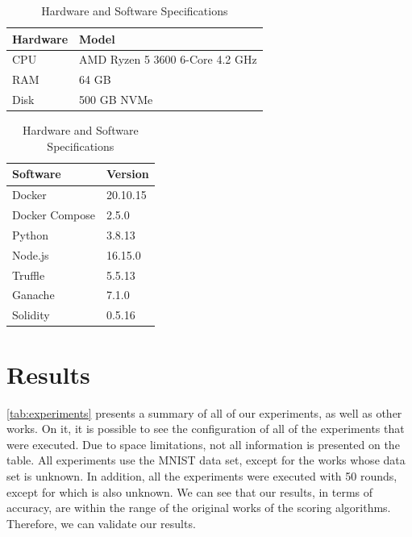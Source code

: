 \begin{table}[!h]
    \begin{subtable}[h]{0.59\textwidth}
        \centering
        \begin{tabular}{l|l} \hline \hline
            Hardware & Model                                    \\ \hline \hline
            CPU      & AMD Ryzen 5 3600 6-Core 4.2 GHz          \\ \hline
            RAM      & 64 GB                                    \\ \hline
            Disk     & 500 GB NVMe                              \\ \hline
        \end{tabular}
        \caption{Hardware}
        \label{evaluation:hardware}
    \end{subtable}
    \hfill
    \begin{subtable}[h]{0.39\textwidth}
        \centering
        \begin{tabular}{l|l} \hline \hline
            Software            & Version               \\ \hline \hline
            Docker              & 20.10.15              \\ \hline
            Docker Compose      & 2.5.0                 \\ \hline
            Python              & 3.8.13               \\ \hline
            Node.js             & 16.15.0               \\ \hline
            Truffle             & 5.5.13               \\ \hline
            Ganache             & 7.1.0               \\ \hline
            Solidity            & 0.5.16               \\ \hline
        \end{tabular}
        \caption{Software}
        \label{evaluation:software}
     \end{subtable}
     \caption{Hardware and Software Specifications}
     \label{tab:temps}
\end{table}

\section{Results}

\autoref{tab:experiments} presents a summary of all of our experiments, as well as other works. On it, it is possible to see the configuration of all of the experiments that were executed. Due to space limitations, not all information is presented on the table. All experiments use the MNIST data set, except for the works \cite{10.48550/arxiv.2007.03856, 10.48550/arxiv.2011.07516} whose data set is unknown. In addition, all the experiments were executed with 50 rounds, except for \cite{9170559} which is also unknown. We can see that our results, in terms of accuracy, are within the range of the original works of the scoring algorithms. Therefore, we can validate our results.

